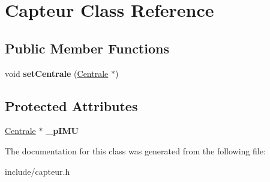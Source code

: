 \hypertarget{class_capteur}{\section{Capteur Class Reference}
\label{class_capteur}
}
\subsection*{Public Member Functions}
\begin{DoxyCompactItemize}
\item 
\hypertarget{class_capteur_a6b5d764b663771908c1bd5e315bf5421}{void {\bfseries set\-Centrale} (\hyperlink{class_centrale}{Centrale} $\ast$)}\label{class_capteur_a6b5d764b663771908c1bd5e315bf5421}

\end{DoxyCompactItemize}
\subsection*{Protected Attributes}
\begin{DoxyCompactItemize}
\item 
\hypertarget{class_capteur_a86b0998391c82d9e7cf71b9141098630}{\hyperlink{class_centrale}{Centrale} $\ast$ {\bfseries \-\_\-p\-I\-M\-U}}\label{class_capteur_a86b0998391c82d9e7cf71b9141098630}

\end{DoxyCompactItemize}


The documentation for this class was generated from the following file\-:\begin{DoxyCompactItemize}
\item 
include/capteur.\-h\end{DoxyCompactItemize}
